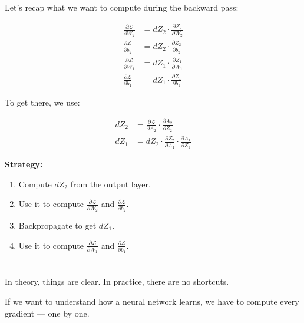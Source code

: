 \documentclass[11pt]{article}
\begin{document}
Let’s recap what we want to compute during the backward pass:

\[
\begin{aligned}
\frac{\partial \mathcal{L}}{\partial W_2} &= dZ_2 \cdot \frac{\partial Z_2}{\partial W_2} \\
\frac{\partial \mathcal{L}}{\partial b_2} &= dZ_2 \cdot \frac{\partial Z_2}{\partial b_2} \\
\frac{\partial \mathcal{L}}{\partial W_1} &= dZ_1 \cdot \frac{\partial Z_1}{\partial W_1} \\
\frac{\partial \mathcal{L}}{\partial b_1} &= dZ_1 \cdot \frac{\partial Z_1}{\partial b_1}
\end{aligned}
\]

\vspace{1em}

To get there, we use:

\[
\begin{aligned}
dZ_2 &= \frac{\partial \mathcal{L}}{\partial A_2} \cdot \frac{\partial A_2}{\partial Z_2} \\
dZ_1 &= dZ_2 \cdot \frac{\partial Z_2}{\partial A_1} \cdot \frac{\partial A_1}{\partial Z_1}
\end{aligned}
\]

\vspace{1em}

\noindent
\textbf{Strategy:}
\begin{enumerate}
    \item Compute $dZ_2$ from the output layer.
    \item Use it to compute $\frac{\partial \mathcal{L}}{\partial W_2}$ and $\frac{\partial \mathcal{L}}{\partial b_2}$.
    \item Backpropagate to get $dZ_1$.
    \item Use it to compute $\frac{\partial \mathcal{L}}{\partial W_1}$ and $\frac{\partial \mathcal{L}}{\partial b_1}$.
\end{enumerate}

\vspace{2em}

\section*{}

In theory, things are clear.  
In practice, there are no shortcuts.

If we want to understand how a neural network learns,  
we have to compute every gradient — one by one.
\end{document}
